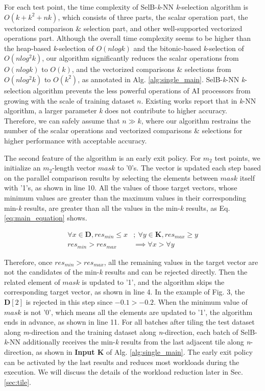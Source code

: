 \documentclass[12pt]{extbook}
\begin{document}
For each test point, the time complexity of SelB-\textit{k}-NN \textit{k}-selection algorithm is $O(k + k^2 + nk)$, which consists of three parts, the scalar operation part, the vectorized comparison \& selection part, and other well-supported vectorized operations part. Although the overall time complexity seems to be higher than the heap-based \textit{k}-selection of $O(nlogk)$ and the bitonic-based \textit{k}-selection of $O(nlog^2k)$, our algorithm significantly reduces the scalar operations from $O(nlogk)$ to $O(k)$, and the vectorized comparisons \& selections from $O(nlog^2k)$ to $O(k^2)$, as annotated in Alg. \ref{alg:single_main}. SelB-\textit{k}-NN \textit{k}-selection algorithm prevents the less powerful operations of AI processors from growing with the scale of training dataset $n$. Existing works \cite{hassanat2014solving, abu2019effects} report that in \textit{k}-NN algorithm, a larger parameter \textit{k} does not contribute to higher accuracy. Therefore, we can safely assume that $n \gg k$, where our algorithm restrains the number of the scalar operations and vectorized comparisons \& selections for higher performance with acceptable accuracy.

The second feature of the algorithm is an early exit policy. For $m_2$ test points, we initialize an $m_2$-length vector $mask$ to '0's. The vector is updated each step based on the parallel comparison results by selecting the elements between $mask$ itself with '1's, as shown in line 10. All the values of those target vectors, whose minimum values are greater than the maximum values in their corresponding min-\textit{k} results, are greater than all the values in the min-\textit{k} results, as Eq. \ref{eq:main_equation} shows. 

\begin{equation}
    \label{eq:main_equation}
    \begin{aligned}
    \forall x \in \textbf{D}, res_{min} \le x &;\ 
        \forall y \in \textbf{K}, res_{max} \ge y \\
    res_{min} > res_{max} &\implies \forall x > \forall y
    \end{aligned}
\end{equation}

Therefore, once $res_{min} > res_{max}$, all the remaining values in the target vector are not the candidates of the min-\textit{k} results and can be rejected directly. Then the related element of $mask$ is updated to '1', and the algorithm skips the corresponding target vector, as shown in line 4. In the example of Fig. 3, the $\textbf{D}[2]$ is rejected in this step since $-0.1 > -0.2$. When the minimum value of $mask$ is not '0', which means all the elements are updated to '1', the algorithm ends in advance, as shown in line 11. For all batches after tiling the test dataset along \textit{m}-direction and the training dataset along \textit{n}-direction, each batch of SelB-\textit{k}-NN additionally receives the min-\textit{k} results from the last adjacent tile along \textit{n}-direction, as shown in \textbf{Input K} of Alg. \ref{alg:single_main}. The early exit policy can be activated by the last results and reduces most workloads during the execution. We will discuss the details of the workload reduction later in Sec. \ref{sec:tile}.
\end{document}
